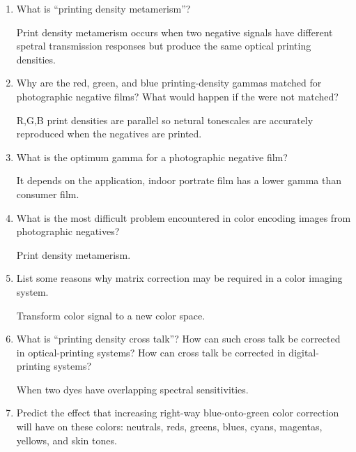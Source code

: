 \documentclass{amsart}
\theoremstyle{definition}
\theoremstyle{remark}
\numberwithin{equation}{section}
\begin{document}
\begin{enumerate}
\item  What is “printing
density metamerism”?
\newline \par Print density metamerism occurs when two negative signals have different spetral
transmission responses but produce the same optical printing
densities.
 \newline
\item  Why are the
red, green, and blue printing-density gammas matched for
photographic negative films? What would happen if the were not
matched?
\newline \par R,G,B print densities are parallel so netural
tonescales are accurately reproduced when the negatives are
printed.
\newline
\item  What is the optimum gamma
for a photographic negative film?
\newline \par It depends on the application, indoor portrate film
has a lower gamma than consumer film.
\newline
\item What is the most difficult problem encountered in color
encoding images from photographic negatives?
\newline \par Print density metamerism.

\item List some reasons why matrix correction may be required in a
color imaging system.
\newline \par Transform color signal to a new color space.
\newline
\item What is “printing density cross talk”? How can such cross
talk be corrected in optical-printing systems? How can cross talk
be corrected in digital-printing systems?
\newline \par When two dyes have overlapping spectral
sensitivities.
\newline
\item Predict the effect that increasing right-way blue-onto-green
color correction will have on these colors: neutrals, reds,
greens, blues, cyans, magentas, yellows, and skin tones.
\end{enumerate}
\end{document}

